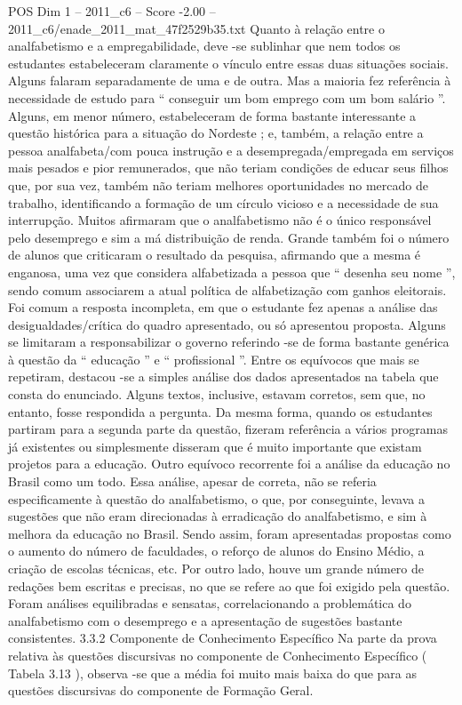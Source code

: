 \begin{textsample}{POS Dim 1 – 2011\_c6 – Score -2.00 – 2011\_c6/enade\_2011\_mat\_47f2529b35.txt}
Quanto à relação entre o analfabetismo e a empregabilidade, deve -se sublinhar que nem todos os estudantes estabeleceram claramente o vínculo entre essas duas situações sociais.
Alguns falaram separadamente de uma e de outra.
Mas a maioria fez referência à necessidade de estudo para “ conseguir um bom emprego com um bom salário ”.
Alguns, em menor número, estabeleceram de forma bastante interessante a questão histórica para a situação do Nordeste ; e, também, a relação entre a pessoa analfabeta/com pouca instrução e a desempregada/empregada em serviços mais pesados e pior remunerados, que não teriam condições de educar seus filhos que, por sua vez, também não teriam melhores oportunidades no mercado de trabalho, identificando a formação de um círculo vicioso e a necessidade de sua interrupção.
Muitos afirmaram que o analfabetismo não é o único responsável pelo desemprego e sim a má distribuição de renda.
Grande também foi o número de alunos que criticaram o resultado da pesquisa, afirmando que a mesma é enganosa, uma vez que considera alfabetizada a pessoa que “ desenha seu nome ”, sendo comum associarem a atual política de alfabetização com ganhos eleitorais.
Foi comum a resposta incompleta, em que o estudante fez apenas a análise das desigualdades/crítica do quadro apresentado, ou só apresentou proposta.
Alguns se limitaram a responsabilizar o governo referindo -se de forma bastante genérica à questão da “ educação ” e “ profissional ”.
Entre os equívocos que mais se repetiram, destacou -se a simples análise dos dados apresentados na tabela que consta do enunciado.
Alguns textos, inclusive, estavam corretos, sem que, no entanto, fosse respondida a pergunta.
Da mesma forma, quando os estudantes partiram para a segunda parte da questão, fizeram referência a vários programas já existentes ou simplesmente disseram que é muito importante que existam projetos para a educação.
Outro equívoco recorrente foi a análise da educação no Brasil como um todo.
Essa análise, apesar de correta, não se referia especificamente à questão do analfabetismo, o que, por conseguinte, levava a sugestões que não eram direcionadas à erradicação do analfabetismo, e sim à melhora da educação no Brasil.
Sendo assim, foram apresentadas propostas como o aumento do número de faculdades, o reforço de alunos do Ensino Médio, a criação de escolas técnicas, etc.
Por outro lado, houve um grande número de redações bem escritas e precisas, no que se refere ao que foi exigido pela questão.
Foram análises equilibradas e sensatas, correlacionando a problemática do analfabetismo com o desemprego e a apresentação de sugestões bastante consistentes. 3.3.2 Componente de Conhecimento Específico Na parte da prova relativa às questões discursivas no componente de Conhecimento Específico ( Tabela 3.13 ), observa -se que a média foi muito mais baixa do que para as questões discursivas do componente de Formação Geral.

\end{textsample}
